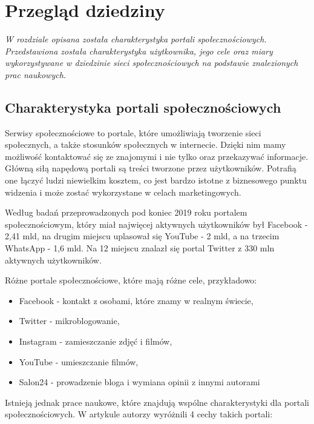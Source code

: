 \documentclass[polish,12pt]{aghthesis}
\begin{document}
\newpage
\section{Przegląd dziedziny}
\emph{W rozdziale opisana została charakterystyka portali społecznościowych. Przedstawiona została charakterystyka użytkownika, jego cele oraz miary wykorzystywane w dziedzinie sieci społecznościowych na podstawie znalezionych prac naukowych. }

\subsection{Charakterystyka portali społecznościowych}
Serwisy społecznościowe to portale, które umożliwiają tworzenie sieci społecznych, a także stosunków społecznych w internecie. Dzięki nim mamy możliwość kontaktować się ze znajomymi i nie tylko oraz przekazywać informacje. Główną siłą napędową portali są treści tworzone przez użytkowników. Potrafią one łączyć ludzi niewielkim kosztem, co jest bardzo istotne z biznesowego punktu widzenia i może zostać wykorzystane w celach marketingowych.

Według badań\cite{socialmediarank} przeprowadzonych pod koniec 2019 roku portalem społecznościowym, który miał najwięcej aktywnych użytkowników był Facebook - 2,41 mld, na drugim miejscu uplasował się YouTube - 2 mld, a na trzecim WhatsApp - 1,6 mld. Na 12 miejscu znalazł się portal Twitter z 330 mln aktywnych użytkowników. 

\vspace{5mm}

Różne portale społecznościowe, które mają różne cele, przykładowo:
\begin{itemize}
    \item Facebook - kontakt z osobami, które znamy w realnym świecie,
    \item Twitter - mikroblogowanie,
    \item Instagram - zamieszczanie zdjęć i filmów,
    \item YouTube - umieszczanie filmów,
    \item Salon24 - prowadzenie bloga i wymiana opinii z innymi autorami 
\end{itemize}

Istnieją jednak prace naukowe, które znajdują wspólne charakterystyki dla portali społecznościowych. W artykule\cite{snsCharacteristics2} autorzy wyróżnili 4 cechy takich portali:
\end{document}
